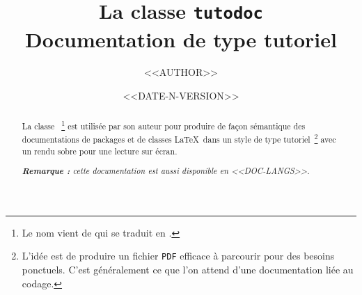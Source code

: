 \documentclass{tutodoc}
\begin{document}
\title{La classe \texttt{tutodoc} \\ Documentation de type tutoriel}
\author{<<AUTHOR>>}
\date{<<DATE-N-VERSION>>}

\maketitle

\begin{abstract}
    La classe \thisproj{}\,%
    \footnote{
        Le nom vient de  qui se traduit en .
    }
    est utilisée par son auteur pour produire de façon sémantique des documentations de packages et de classes \LaTeX\ dans un style de type tutoriel\,%
    \footnote{
        L'idée est de produire un fichier \texttt{PDF} efficace à parcourir pour des besoins ponctuels. C'est généralement ce que l'on attend d'une documentation liée au codage.
    }
    avec un rendu sobre pour une lecture sur écran.

    \smallskip

    \noindent
    \emph{\textbf{Remarque :} cette documentation est aussi disponible en <<DOC-LANGS>>.}
\end{abstract}
\end{document}
